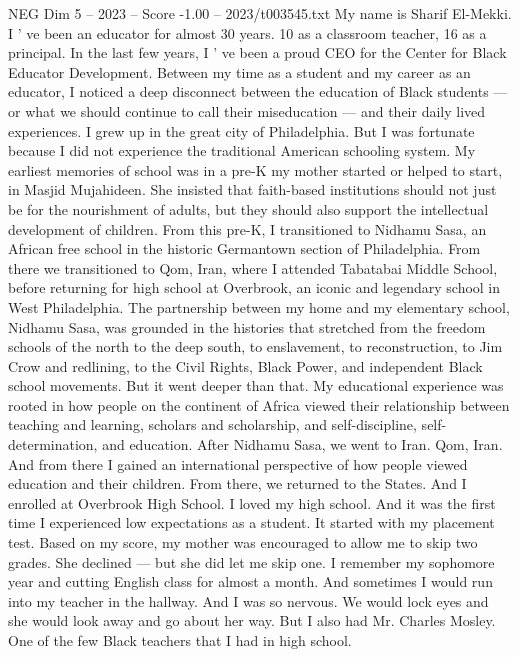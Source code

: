 \begin{textsample}{NEG Dim 5 – 2023 – Score -1.00 – 2023/t003545.txt}  \label{ex:f5_neg_011}
My name is Sharif El-Mekki.
I ' ve been an educator for almost 30 years. 10 as a classroom teacher, 16 as a principal.
In the last few years, I ' ve been a proud CEO for the Center for Black Educator Development.
Between my time as a student and my career as an educator, I noticed a deep disconnect between the education of Black students — or what we should continue to call their miseducation — and their daily lived experiences.
I grew up in the great city of Philadelphia.
But I was fortunate because I did not experience the traditional American schooling system.
My earliest memories of school was in a pre-K my mother started or helped to start, in Masjid Mujahideen.
She insisted that faith-based institutions should not just be for the nourishment of adults, but they should also support the intellectual development of children.
From this pre-K, I transitioned to Nidhamu Sasa, an African free school in the historic Germantown section of Philadelphia.
From there we transitioned to Qom, Iran, where I attended Tabatabai Middle School, before returning for high school at Overbrook, an iconic and legendary school in West Philadelphia.
The partnership between my home and my elementary school, Nidhamu Sasa, was grounded in the histories that stretched from the freedom schools of the north to the deep south, to enslavement, to reconstruction, to Jim Crow and redlining, to the Civil Rights, Black Power, and independent Black school movements.
But it went deeper than that.
My educational experience was rooted in how people on the continent of Africa viewed their relationship between teaching and learning, scholars and scholarship, and self-discipline, self-determination, and education.
After Nidhamu Sasa, we went to Iran.
Qom, Iran.
And from there I gained an international perspective of how people viewed education and their children.
From there, we returned to the States.
And I enrolled at Overbrook High School.
I loved my high school.
And it was the first time I experienced low expectations as a student.
It started with my placement test.
Based on my score, my mother was encouraged to allow me to skip two grades.
She declined — but she did let me skip one.
I remember my sophomore year and cutting English class for almost a month.
And sometimes I would run into my teacher in the hallway.
And I was so nervous.
We would lock eyes and she would look away and go about her way.
But I also had Mr.
Charles Mosley.
One of the few Black teachers that I had in high school.

\end{textsample}
